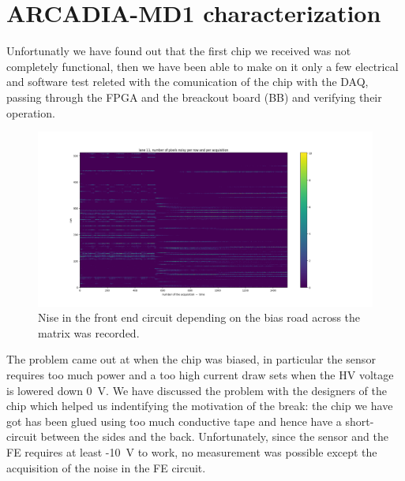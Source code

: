 \section{ARCADIA-MD1 characterization}
    Unfortunatly we have found out that the first chip we received was not completely functional, then we have been able to make on it only a few electrical and software test releted with the comunication of the chip with the DAQ, passing through the FPGA and the breackout board (BB) and verifying their operation.
    \begin{figure}[h!]
        \centering
        \includegraphics[width=.9\linewidth]{figures/charaterization/ARCADIA/pixel_per_row_per_acq_11_60.png}
        \caption{Nise in the front end circuit depending on the bias road across the matrix was recorded. }
        \label{fig:ARCADIA_threshold}
    \end{figure}  
    The problem came out at when the chip was biased, in particular the sensor requires too much power and a too high current draw sets when the HV voltage is lowered down \SI{0}{V}. We have discussed the problem with the designers of the chip which helped us indentifying the motivation of the break: the chip we have got has been glued using too much conductive tape and hence have a short-circuit between the sides and the back. 
    Unfortunately, since the sensor and the FE requires at least -\SI{10}{V} to work, no measurement was possible except the acquisition of the noise in the FE circuit. 


